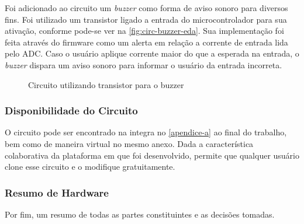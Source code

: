 Foi adicionado ao circuito um \textit{buzzer} como forma de aviso sonoro para diversos fins. Foi utilizado um transistor ligado a entrada do microcontrolador para sua ativação, conforme pode-se ver na \autoref{fig:circ-buzzer-eda}. Sua implementação foi feita através do firmware como um alerta em relação a corrente de entrada lida pelo ADC. Caso o usuário aplique corrente maior do que a esperada na entrada, o \textit{buzzer} dispara um aviso sonoro para informar o usuário da entrada incorreta.

\begin{figure}[htb!]
    \caption{Circuito utilizando transistor para o buzzer}
    \label{fig:circ-buzzer-eda}
    \fonte{}
\end{figure}

\subsubsection{Disponibilidade do Circuito}\label{availability}

O circuito pode ser encontrado na integra no \autoref{apendice-a} ao final do trabalho, bem como de maneira virtual no mesmo anexo. Dada a característica colaborativa da plataforma em que foi desenvolvido, permite que qualquer usuário clone esse circuito e o modifique gratuitamente.

\subsubsection{Resumo de Hardware}\label{resumo-hardware}

Por fim, um resumo de todas as partes constituintes e as decisões tomadas.

